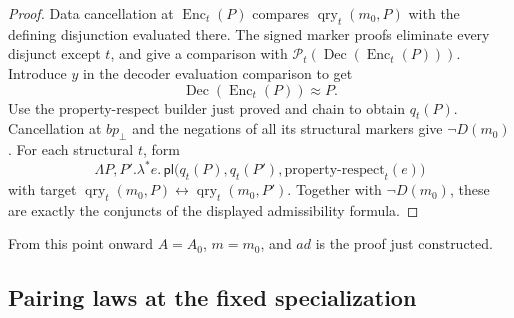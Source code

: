 \begin{proof}
Data cancellation at \(\operatorname{Enc}_t(P)\) compares
\(\operatorname{qry}_t(m_0,P)\) with the defining disjunction
evaluated there.  The signed marker proofs eliminate every
disjunct except \(t\), and give a comparison with
\(\mathcal P_t(\operatorname{Dec}(\operatorname{Enc}_t(P)))\).
Introduce \(y\) in the decoder evaluation comparison to get
\[
 \operatorname{Dec}(\operatorname{Enc}_t(P))\approx P.
\]
Use the property-respect builder just proved and chain to
obtain \(q_t(P)\).  Cancellation at \(bp_\bot\) and the
negations of all its structural markers give \(\neg D(m_0)\).
For each structural \(t\), form
\[
 \Lambda P,P'.\lambda^*e.\,
 \mathsf{pl}\bigl(q_t(P),q_t(P'),
                      \text{property-respect}_t(e)\bigr)
\]
with target
\(\operatorname{qry}_t(m_0,P)\leftrightarrow
\operatorname{qry}_t(m_0,P')\).
Together with \(\neg D(m_0)\), these are exactly the
conjuncts of the displayed admissibility formula.
\end{proof}

From this point onward \(A=A_0\), \(m=m_0\), and \(ad\) is
the proof just constructed.

\subsection{Pairing laws at the fixed specialization}

